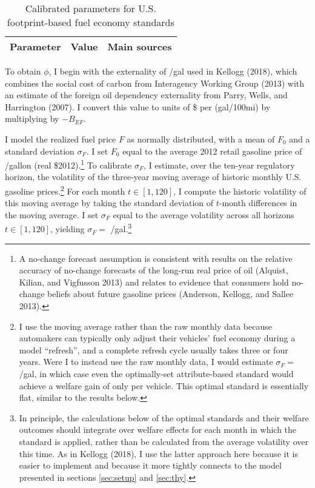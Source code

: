 \documentclass[12pt]{article}
\begin{document}
\begin{table}[!t]
\begin{center}
\caption{Calibrated parameters for U.S. footprint-based fuel economy standards}
\begin{footnotesize}
\begin{tabular}{lll}
Parameter & Value & Main sources \\
\hline

\hline
\end{tabular}
\end{footnotesize}
\label{tab:calfoot}
\end{center}
\end{table}

To obtain $\phi$, I begin with the externality of \unskip /gal used in Kellogg (2018), which combines the social cost of carbon from Interagency Working Group (2013) with an estimate of the foreign oil dependency externality from Parry, Wells, and Harrington (2007). I convert this value to units of \$ per (gal/100mi) by multiplying by $-B_{EF}$. 

I model the realized fuel price $F$ as normally distributed, with a mean of $F_0$ and a standard deviation $\sigma_F$. I set $F_0$ equal to the average 2012 retail gasoline price of \unskip /gallon (real \$2012).\footnote{A no-change forecast assumption is consistent with results on the relative accuracy of no-change forecasts of the long-run real price of oil (Alquist, Kilian, and Vigfusson 2013) and relates to evidence that consumers hold no-change beliefs about future gasoline prices (Anderson, Kellogg, and Sallee 2013).} To calibrate $\sigma_F$, I estimate, over the ten-year regulatory horizon, the volatility of the three-year moving average of historic monthly U.S. gasoline prices.\footnote{I use the moving average rather than the raw monthly data because automakers can typically only adjust their vehicles' fuel economy during a model ``refresh'', and a complete refresh cycle usually takes three or four years. Were I to instead use the raw monthly data, I would estimate $\sigma_F=$ \unskip /gal, in which case even the optimally-set attribute-based standard would achieve a welfare gain of only per vehicle. This optimal standard is essentially flat, similar to the results below.} For each month $t\in[1,120]$, I compute the historic volatility of this moving average by taking the standard deviation of $t$-month differences in the moving average. I set $\sigma_F$ equal to the average volatility across all horizons $t\in[1,120]$, yielding $\sigma_F=$ \unskip /gal.\footnote{In principle, the calculations below of the optimal standards and their welfare outcomes should integrate over welfare effects for each month in which the standard is applied, rather than be calculated from the average volatility over this time. As in Kellogg (2018), I use the latter approach here because it is easier to implement and because it more tightly connects to the model presented in sections \ref{sec:setup} and \ref{sec:thy}.}
\end{document}
